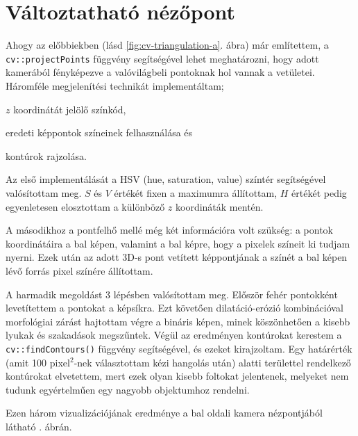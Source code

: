 \section{Változtatható nézőpont}

Ahogy az előbbiekben (lásd \ref{fig:cv-triangulation-a}. ábra) már említettem, a \texttt{cv::projectPoints} függvény segítségével lehet meghatározni, hogy adott kamerából fényképezve a valóvilágbeli pontoknak hol vannak a vetületei. Háromféle megjelenítési technikát implementáltam; \begin{inparaenum}[\itshape 1\upshape)]
\item $z$ koordinátát jelölő színkód,
\item eredeti képpontok színeinek felhasználása és
\item kontúrok rajzolása.
\end{inparaenum}

Az első implementálását a HSV (hue, saturation, value) színtér segítségével valósítottam meg. $S$ és $V$ értékét fixen a maximumra állítottam, $H$ értékét pedig egyenletesen elosztottam a különböző $z$ koordináták mentén.

A másodikhoz a pontfelhő mellé még két információra volt szükség: a pontok koordinátáira a bal képen, valamint a bal képre, hogy a pixelek színeit ki tudjam nyerni. Ezek után az adott 3D-s pont vetített képpontjának a színét a bal képen lévő forrás pixel színére állítottam.

A harmadik megoldást 3 lépésben valósítottam meg. Először fehér pontokként levetítettem a pontokat a képsíkra. Ezt követően dilatáció-erózió kombinációval morfológiai zárást hajtottam végre a bináris képen, minek köszönhetően a kisebb lyukak és szakadások megszűntek. Végül az eredményen kontúrokat kerestem a \texttt{cv::findContours()} függvény segítségével, és ezeket kirajzoltam. Egy határérték (amit 100 pixel$^2$-nek választottam kézi hangolás után) alatti területtel rendelkező kontúrokat elvetettem, mert ezek olyan kisebb foltokat jelentenek, melyeket nem tudunk egyértelműen egy nagyobb objektumhoz rendelni.

Ezen három vizualizációjának eredménye a bal oldali kamera nézpontjából látható . ábrán.

